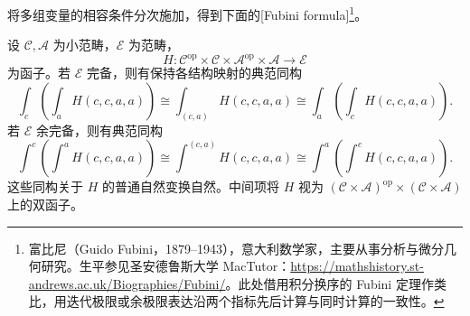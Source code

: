将多组变量的相容条件分次施加，得到下面的[Fubini formula]\footnote{富比尼（Guido Fubini，1879--1943），意大利数学家，主要从事分析与微分几何研究。生平参见圣安德鲁斯大学 MacTutor：\url{https://mathshistory.st-andrews.ac.uk/Biographies/Fubini/}。此处借用积分换序的 Fubini 定理作类比，用迭代极限或余极限表达沿两个指标先后计算与同时计算的一致性。}。

\begin{theorem}\label{b4:thm:end-coend-fubini}
	设 \(\mathcal C,\mathcal A\) 为小范畴，\(\mathcal E\) 为范畴，
	\[
		H:\mathcal C^{\mathrm{op}}\times\mathcal C
		\times\mathcal A^{\mathrm{op}}\times\mathcal A
		\longrightarrow\mathcal E
	\]
	为函子。若 \(\mathcal E\) 完备，则有保持各结构映射的典范同构
	\[
		\int_c\left(\int_aH(c,c,a,a)\right)
		\cong\int_{(c,a)}H(c,c,a,a)
		\cong\int_a\left(\int_cH(c,c,a,a)\right).
	\]
	若 \(\mathcal E\) 余完备，则有典范同构
	\[
		\int^c\left(\int^aH(c,c,a,a)\right)
		\cong\int^{(c,a)}H(c,c,a,a)
		\cong\int^a\left(\int^cH(c,c,a,a)\right).
	\]
	这些同构关于 \(H\) 的普通自然变换自然。中间项将 \(H\) 视为 \((\mathcal C\times\mathcal A)^{\mathrm{op}}\times(\mathcal C\times\mathcal A)\) 上的双函子。
\end{theorem}
